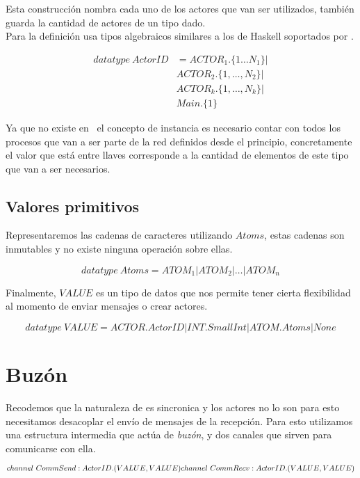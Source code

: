Esta construcción nombra cada uno de los actores que van ser utilizados, también
guarda la cantidad de actores de un tipo dado. \\
Para la definición usa tipos algebraicos similares a los de Haskell soportados por \CSPm.

\begin{figure}[H]
\begin{align*}
  datatype\ ActorID &= ACTOR_1.\{1 \ldots N_1\} | \\
  & ACTOR_2.\{1, \ldots ,N_2\} | \\
  & ACTOR_k.\{1, \ldots, N_k\} | \\
  & Main.\{1\}
\end{align*}
\end{figure}

Ya que no existe en \CSP\ el concepto de instancia es necesario contar con todos los 
procesos que van a ser parte de la red definidos desde el principio, concretamente 
el valor que está entre llaves corresponde a la cantidad de elementos de este
tipo que van a ser necesarios. 

\subsection{Valores primitivos}

Representaremos las cadenas de caracteres utilizando $Atoms$, estas cadenas son inmutables y no existe ninguna operación sobre ellas.

\[
  datatype\ Atoms = ATOM_1 | ATOM_2 | \ldots | ATOM_n
\]

Finalmente, $VALUE$ es un tipo de datos que nos permite tener cierta flexibilidad al momento de enviar mensajes o crear actores.

\[
  datatype\ VALUE = ACTOR.ActorID | INT.SmallInt | ATOM.Atoms | None
\]

\section{Buzón}

Recodemos que la naturaleza de \CSP es sincronica y los actores no lo son para esto necesitamos desacoplar el envío de mensajes de la recepción. Para esto utilizamos una estructura intermedia que actúa de \textit{buzón}, y dos canales que sirven para comunicarse con ella.

\[
channel\ CommSend:ActorID.(VALUE, VALUE)\\
channel\ CommRecv:ActorID.(VALUE, VALUE)
\]


